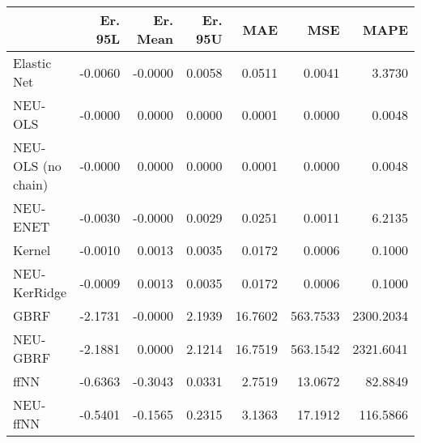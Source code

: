 \begin{tabular}{lrrrrrr}
\toprule
{} &  Er. 95L &  Er. Mean &  Er. 95U &     MAE &      MSE &      MAPE \\
\midrule
Elastic Net        &  -0.0060 &   -0.0000 &   0.0058 &  0.0511 &   0.0041 &    3.3730 \\
NEU-OLS            &  -0.0000 &    0.0000 &   0.0000 &  0.0001 &   0.0000 &    0.0048 \\
NEU-OLS (no chain) &  -0.0000 &    0.0000 &   0.0000 &  0.0001 &   0.0000 &    0.0048 \\
NEU-ENET           &  -0.0030 &   -0.0000 &   0.0029 &  0.0251 &   0.0011 &    6.2135 \\
Kernel             &  -0.0010 &    0.0013 &   0.0035 &  0.0172 &   0.0006 &    0.1000 \\
NEU-KerRidge       &  -0.0009 &    0.0013 &   0.0035 &  0.0172 &   0.0006 &    0.1000 \\
GBRF               &  -2.1731 &   -0.0000 &   2.1939 & 16.7602 & 563.7533 & 2300.2034 \\
NEU-GBRF           &  -2.1881 &    0.0000 &   2.1214 & 16.7519 & 563.1542 & 2321.6041 \\
ffNN               &  -0.6363 &   -0.3043 &   0.0331 &  2.7519 &  13.0672 &   82.8849 \\
NEU-ffNN           &  -0.5401 &   -0.1565 &   0.2315 &  3.1363 &  17.1912 &  116.5866 \\
\bottomrule
\end{tabular}
